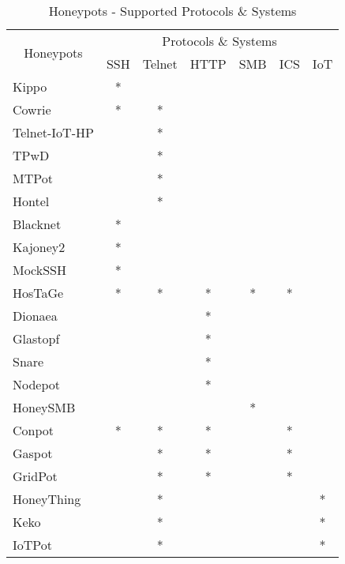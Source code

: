 \begin{table}[ht!]
\begin{tabular}{|l|c|c|c|c|c|c|}
\hline
\multicolumn{1}{|c|}{\multirow{2}{*}{Honeypots}} & \multicolumn{6}{c|}{Protocols \& Systems} \\ \cline{2-7} 
\multicolumn{1}{|c|}{} & \multicolumn{1}{l|}{SSH} & \multicolumn{1}{l|}{Telnet} & \multicolumn{1}{l|}{HTTP} & \multicolumn{1}{l|}{SMB} & \multicolumn{1}{l|}{ICS} & \multicolumn{1}{l|}{IoT} \\ \hline
Kippo & * &  &  &  &  &  \\ \hline
Cowrie & * & * &  &  &  &  \\ \hline
Telnet-IoT-HP &  & * &  &  &  &  \\ \hline
TPwD &  & * &  &  &  &  \\ \hline
MTPot &  & * &  &  &  &  \\ \hline
Hontel &  & * &  &  &  &  \\ \hline
Blacknet & * &  &  &  &  &  \\ \hline
Kajoney2 & * &  &  &  &  &  \\ \hline
MockSSH & * &  &  &  &  &  \\ \hline
HosTaGe & * & * & * & * & * &  \\ \hline
Dionaea &  &  & * &  &  &  \\ \hline
Glastopf &  &  & * &  &  &  \\ \hline
Snare &  &  & * &  &  &  \\ \hline
Nodepot &  &  & * &  &  &  \\ \hline
HoneySMB & \multicolumn{1}{l|}{} & \multicolumn{1}{l|}{} & \multicolumn{1}{l|}{} & * & \multicolumn{1}{l|}{} & \multicolumn{1}{l|}{} \\ \hline
Conpot & * & * & * &  & * &  \\ \hline
Gaspot &  & * & * &  & * &  \\ \hline
GridPot &  & * & * &  & * &  \\ \hline
HoneyThing &  & * &  &  &  & * \\ \hline
Keko &  & * &  &  &  & * \\ \hline
IoTPot &  & * &  &  &  & * \\ \hline
\end{tabular}%
\caption{Honeypots - Supported Protocols \& Systems}
\label{tab:protocols-honeypots}
\end{table}








